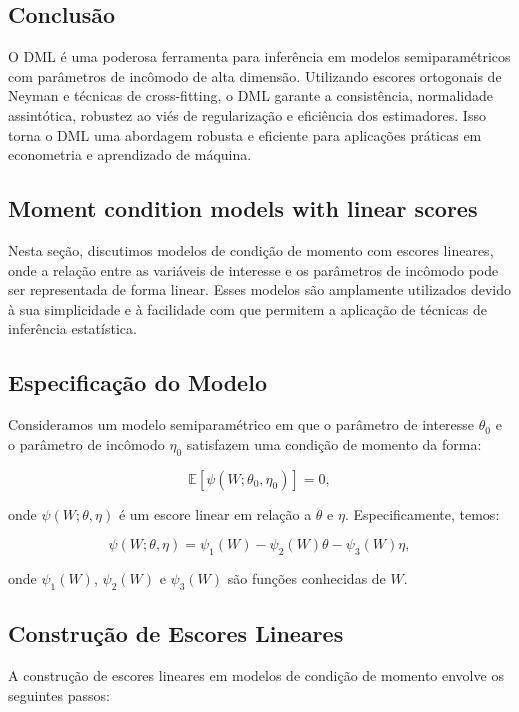\documentclass[a4paper,12pt]{article}[abntex2]
\begin{document}
\subsection*{Conclusão}

O DML é uma poderosa ferramenta para inferência em modelos semiparamétricos com parâmetros de incômodo de alta dimensão. Utilizando escores ortogonais de Neyman e técnicas de cross-fitting, o DML garante a consistência, normalidade assintótica, robustez ao viés de regularização e eficiência dos estimadores. Isso torna o DML uma abordagem robusta e eficiente para aplicações práticas em econometria e aprendizado de máquina.

\subsection{Moment  condition  models  with  linear  scores}

Nesta seção, discutimos modelos de condição de momento com escores lineares, onde a relação entre as variáveis de interesse e os parâmetros de incômodo pode ser representada de forma linear. Esses modelos são amplamente utilizados devido à sua simplicidade e à facilidade com que permitem a aplicação de técnicas de inferência estatística.

\subsection*{Especificação do Modelo}

Consideramos um modelo semiparamétrico em que o parâmetro de interesse $\theta_0$ e o parâmetro de incômodo $\eta_0$ satisfazem uma condição de momento da forma:

\[
\mathbb{E}[\psi(W; \theta_0, \eta_0)] = 0,
\]

onde $\psi(W; \theta, \eta)$ é um escore linear em relação a $\theta$ e $\eta$. Especificamente, temos:

\[
\psi(W; \theta, \eta) = \psi_1(W) - \psi_2(W)\theta - \psi_3(W)\eta,
\]

onde $\psi_1(W)$, $\psi_2(W)$ e $\psi_3(W)$ são funções conhecidas de $W$.

\subsection*{Construção de Escores Lineares}

A construção de escores lineares em modelos de condição de momento envolve os seguintes passos:
\end{document}
